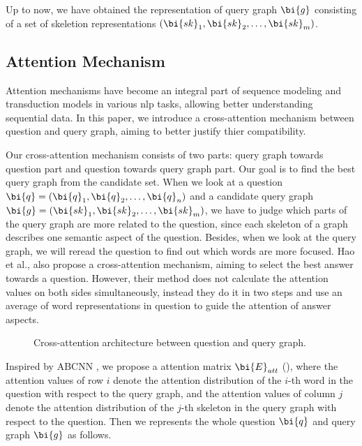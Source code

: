 Up to now, we have obtained the representation of query graph $\bi{g}$ consisting of a set of skeletion representations $(\bi{sk}_1, \bi{sk}_2, \dots, \bi{sk}_m)$.




\subsection{Attention Mechanism}
\label{sec:attention}

Attention mechanisms \cite{bahdanau2014neural,luong2015effective} have become an integral part of sequence modeling and transduction models in various nlp tasks, allowing better understanding sequential data. In this paper, we introduce a cross-attention mechanism between question and query graph, aiming to better justify thier compatibility.

Our cross-attention mechanism consists of two parts: query graph towards question part and question towards query graph part. Our goal is to find the best query graph from the candidate set. When we look at a question $\bi{q} = (\bi{q}_1, \bi{q}_2, \dots, \bi{q}_n)$ and a candidate query graph $\bi{g} = (\bi{sk}_1, \bi{sk}_2, \dots, \bi{sk}_m)$, we have to judge which parts of the query graph are more related to the question, since each skeleton of a graph describes one semantic aspect of the question. Besides, when we look at the query graph, we will reread the question to find out which words are more focused. Hao et al., \cite{hao2017end} also propose a cross-attention mechanism, aiming to select the best answer towards a question. However, their method does not calculate the attention values on both sides simultaneously, instead they do it in two steps and use an average of word representations in question to guide the attention of answer aspects. 

\begin{figure*}
	\centering
	\caption{Cross-attention architecture between question and query graph.}
	\label{fig:attention}
\end{figure*}

Inspired by ABCNN \cite{yin2015abcnn}, we propose a attention matrix $\bi{E}_{att}$  (), where the attention values of row $i$ denote the attention distribution of the $i$-th word in the question with respect to the query graph, and the attention values of column $j$ denote the attention distribution of the $j$-th skeleton in the query graph with respect to the question. Then we represents the whole question $\bi{q}$ and query graph $\bi{g}$ as follows. 




